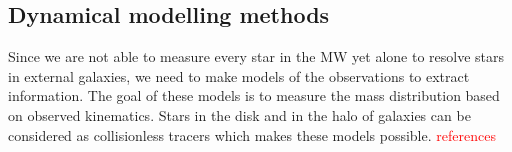 \iffalse
\subsubsection{Application}
MW \acp{GC} proper motions and dynamics (including action distribution and dynamical model of potentials): \cite{Vasiliev...GCdynsGaiaDR2...2018}\\
Modelling the \ac{MW}'s \ac{GC} system: \cite{Binney...GCsystem...2017}
\fi
\subsection{Dynamical modelling methods}
Since we are not able to measure every star in the \ac{MW} yet alone to resolve stars in external galaxies, we need to make models of the observations to extract information. The goal of these models is to measure the mass distribution based on observed kinematics. Stars in the disk and in the halo of galaxies can be considered as collisionless tracers which makes these models possible. \textcolor{red}{references}

